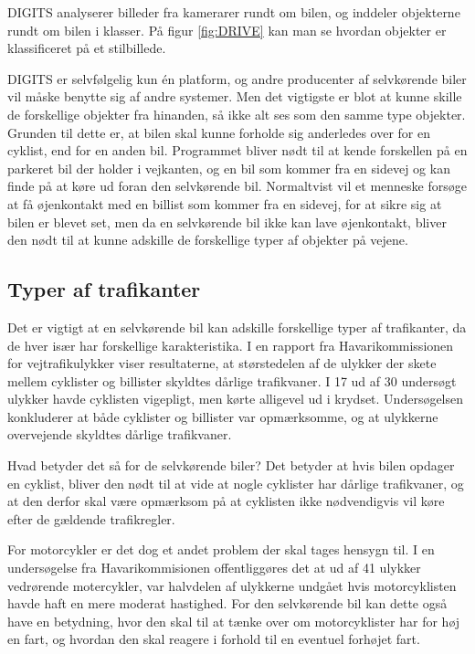 DIGITS analyserer billeder fra kamerarer rundt om bilen, og inddeler objekterne rundt om bilen i klasser. På figur \ref{fig:DRIVE} kan man se hvordan objekter er klassificeret på et stilbillede.

DIGITS er selvfølgelig kun \'en platform, og andre producenter af selvkørende biler vil måske benytte sig af andre systemer. Men det vigtigste er blot at kunne skille de forskellige objekter fra hinanden\cite{cnet}, så ikke alt ses som den samme type objekter. Grunden til dette er, at bilen skal kunne forholde sig anderledes over for en cyklist, end for en anden bil. Programmet bliver nødt til at kende forskellen på en parkeret bil der holder i vejkanten, og en bil som kommer fra en sidevej og kan finde på at køre ud foran den selvkørende bil. Normaltvist vil et menneske forsøge at få øjenkontakt med en billist som kommer fra en sidevej, for at sikre sig at bilen er blevet set, men da en selvkørende bil ikke kan lave øjenkontakt, bliver den nødt til at kunne adskille de forskellige typer af objekter på vejene.

\subsection{Typer af trafikanter}
Det er vigtigt at en selvkørende bil kan adskille forskellige typer af trafikanter, da de hver især har forskellige karakteristika. I en rapport fra Havarikommissionen for vejtrafikulykker viser resultaterne, at størstedelen af de ulykker der skete mellem cyklister og billister skyldtes dårlige trafikvaner\cite{HVU}. I 17 ud af 30 undersøgt ulykker havde cyklisten vigepligt, men kørte alligevel ud i krydset. Undersøgelsen konkluderer at både cyklister og billister var opmærksomme, og at ulykkerne overvejende skyldtes dårlige trafikvaner. 

Hvad betyder det så for de selvkørende biler? Det betyder at hvis bilen opdager en cyklist, bliver den nødt til at vide at nogle cyklister har dårlige trafikvaner, og at den derfor skal være opmærksom på at cyklisten ikke nødvendigvis vil køre efter de gældende trafikregler. 

For motorcykler er det dog et andet problem der skal tages hensygn til.  I en undersøgelse fra Havarikommisionen offentliggøres det at ud af 41 ulykker vedrørende motercykler, var halvdelen af ulykkerne undgået hvis motorcyklisten havde haft en mere moderat hastighed\cite{MOT}. For den selvkørende bil kan dette også have en betydning, hvor den skal til at tænke over om motorcyklister har for høj en fart, og hvordan den skal reagere i forhold til en eventuel forhøjet fart.

